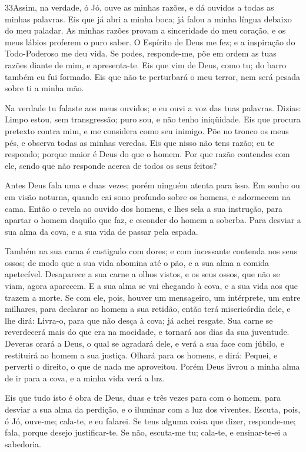 \medskip

\lettrine{33} Assim, na verdade, ó Jó, ouve as minhas razões,
e dá ouvidos a todas as minhas palavras. Eis que já abri a minha
boca; já falou a minha língua debaixo do meu paladar. As minhas
razões provam a sinceridade do meu coração, e os meus lábios
proferem o puro saber. O Espírito de Deus me fez; e a inspiração
do Todo-Poderoso me deu vida. Se podes, responde-me, põe em
ordem as tuas razões diante de mim, e apresenta-te. Eis que vim
de Deus, como tu; do barro também eu fui formado. Eis que não te
perturbará o meu terror, nem será pesada sobre ti a minha mão.

Na verdade tu falaste aos meus ouvidos; e eu ouvi a voz das tuas
palavras. Dizias: Limpo estou, sem transgressão; puro sou, e não
tenho iniqüidade. Eis que procura pretexto contra mim, e me
considera como seu inimigo. Põe no tronco os meus pés, e
observa todas as minhas veredas. Eis que nisso não tens
razão; eu te respondo; porque maior é Deus do que o homem.
Por que razão contendes com ele, sendo que não responde
acerca de todos os seus feitos?

Antes Deus fala uma e duas vezes; porém ninguém atenta para isso.
Em sonho ou em visão noturna, quando cai sono profundo sobre
os homens, e adormecem na cama. Então o revela ao ouvido dos
homens, e lhes sela a sua instrução, para apartar o homem
daquilo que faz, e esconder do homem a soberba. Para desviar
a sua alma da cova, e a sua vida de passar pela espada.

Também na sua cama é castigado com dores; e com incessante
contenda nos seus ossos; de modo que a sua vida abomina até o
pão, e a sua alma a comida apetecível. Desaparece a sua carne
a olhos vistos, e os seus ossos, que não se viam, agora aparecem.
E a sua alma se vai chegando à cova, e a sua vida aos que
trazem a morte. Se com ele, pois, houver um mensageiro, um
intérprete, um entre milhares, para declarar ao homem a sua retidão,
então terá misericórdia dele, e lhe dirá: Livra-o, para que
não desça à cova; já achei resgate. Sua carne se reverdecerá
mais do que era na mocidade, e tornará aos dias da sua juventude.
Deveras orará a Deus, o qual se agradará dele, e verá a sua
face com júbilo, e restituirá ao homem a sua justiça. Olhará
para os homens, e dirá: Pequei, e perverti o direito, o que de nada
me aproveitou. Porém Deus livrou a minha alma de ir para a
cova, e a minha vida verá a luz.

Eis que tudo isto é obra de Deus, duas e três vezes para com o
homem, para desviar a sua alma da perdição, e o iluminar com
a luz dos viventes. Escuta, pois, ó Jó, ouve-me; cala-te, e
eu falarei. Se tens alguma coisa que dizer, responde-me;
fala, porque desejo justificar-te. Se não, escuta-me tu;
cala-te, e ensinar-te-ei a sabedoria.

